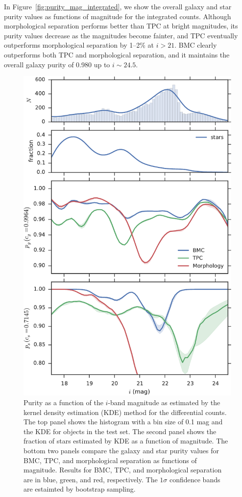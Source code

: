 \documentclass[useAMS,usenatbib]{mn2e}
\begin{document}
In Figure~\ref{fig:purity_mag_integrated}, we show
the overall galaxy and star purity values as functions of magnitude
for the integrated counts.
Although morphological separation performs better than TPC
at bright magnitudes, its purity values decrease as 
the magnitudes become fainter, and
TPC eventually outperforms morphological separation by 1--2\% at
$i > 21$.
BMC clearly outperforms both TPC and morphological separation,
and it maintains the overall galaxy purity of 0.980
up to $i \sim 24.5$.


\begin{figure}
  \centering
  \includegraphics[width=\columnwidth]{figures/purity_mag.pdf}
  \caption{Purity as a function of the $i$-band magnitude
           as estimated by the kernel density estimation (KDE) method
           for the differential counts.
           The top panel shows the histogram with a bin size of 0.1 mag
           and the KDE for objects in the test set.
           The second panel shows the fraction of stars estimated by KDE
           as a function of magnitude.
           The bottom two panels compare
           the galaxy and star purity values for BMC, TPC, and 
           morphological separation as functions of magnitude.
           Results for BMC, TPC, and morphological separation are in
           blue, green, and red, respectively.
           The $1 \sigma$ confidence bands are estaimted by
           bootstrap sampling.}
  \label{fig:purity_mag}
\end{figure}
\end{document}
